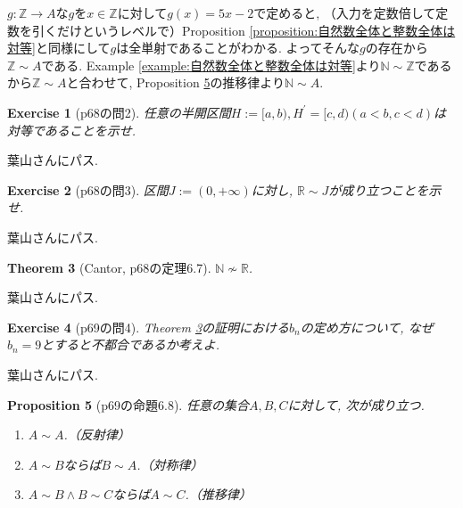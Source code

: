 \documentclass[a4j,dvipdfmx,10pt]{ujreport}
\makeatletter
\theoremstyle{mystyle}
\newtheorem{my-theorem}{Theorem}[section]
\newtheorem{my-proposition}[my-theorem]{Proposition}
\newtheorem{my-exercise}[my-theorem]{Exercise}
\newcommand{\thmsymbol}{$\blacksquare$}
\newenvironment{theorem}[1][]{
  \begin{my-theorem}[#1]%
  \renewcommand{\qedsymbol}{\thmsymbol}\pushQED{\qed}}%
  {\popQED\end{my-theorem}
}
\newenvironment{proposition}[1][]{
  \begin{my-proposition}[#1]%
  \renewcommand{\qedsymbol}{\thmsymbol}\pushQED{\qed}}%
  {\popQED\end{my-proposition}
}
\newenvironment{exercise}[1][]{
  \begin{my-exercise}[#1]%
  \renewcommand{\qedsymbol}{\thmsymbol}\pushQED{\qed}}%
  {\popQED\end{my-exercise}
}
\renewcommand{\proofname}{Proof}
\renewenvironment{proof}[1][\proofname]{\par
  \pushQED{\qed}%
  \normalfont \topsep6\p@\@plus6\p@\relax
  \trivlist
  \item[\hskip\labelsep
        \itshape
    {\bf\underline{#1}\@addpunct{\ }}]\ignorespaces
}{%
  \popQED\endtrivlist\@endpefalse
}
\newenvironment{answer}{\begin{proof}[Answer]}{\end{proof}}
\newcommand{\tempdefeq}{:=}
\newcommand{\dash}[1]{#1 ^{\prime}}
\newcommand{\map}[3]{#1\colon #2 \to #3}
\makeatother
\begin{document}
\begin{answer}
  $\map{g}{\mathbb{Z}}{A}$な$g$を$x\in \mathbb{Z}$に対して$g(x)=5x-2$で定めると,
  （入力を定数倍して定数を引くだけというレベルで）Proposition \ref{proposition:自然数全体と整数全体は対等}と同様にして$g$は全単射であることがわかる.
  よってそんな$g$の存在から$\mathbb{Z}\sim A$である.
  Example \ref{example:自然数全体と整数全体は対等}より$\mathbb{N}\sim \mathbb{Z}$であるから$\mathbb{Z}\sim A$と合わせて,
  Proposition \ref{proposition:対等関係は同値関係}の推移律より$\mathbb{N}\sim A$.
\end{answer}

\begin{exercise}[p68の問2]
  任意の半開区間$H\tempdefeq [a,b),\dash{H}=[c,d)(a<b,c<d)$は対等であることを示せ.
\end{exercise}

\begin{answer}
  葉山さんにパス.
\end{answer}

\begin{exercise}[p68の問3]
  区間$J\tempdefeq (0,+\infty)$に対し,
  $\mathbb{R}\sim J$が成り立つことを示せ.
\end{exercise}

\begin{answer}
  葉山さんにパス.
\end{answer}

\begin{theorem}[Cantor, p68の定理6.7]
  \label{theorem:自然数全体と実数全体は対等でない}
  $\mathbb{N} \nsim \mathbb{R}$.
\end{theorem}

\begin{proof}
  葉山さんにパス.
\end{proof}

\begin{exercise}[p69の問4]
  Theorem \ref{theorem:自然数全体と実数全体は対等でない}の証明における$b_n$の定め方について,
  なぜ$b_n=9$とすると不都合であるか考えよ.
\end{exercise}

\begin{answer}
  葉山さんにパス.
\end{answer}

\begin{proposition}[p69の命題6.8]
  \label{proposition:対等関係は同値関係}
  任意の集合$A,B,C$に対して,
  次が成り立つ.
  \begin{enumerate}
    \item $A\sim A$.（反射律）
    \item $A\sim B$ならば$B\sim A$.（対称律）
    \item $A\sim B \land B\sim C$ならば$A\sim C$.（推移律） \qedhere
  \end{enumerate}
\end{proposition}
\end{document}
